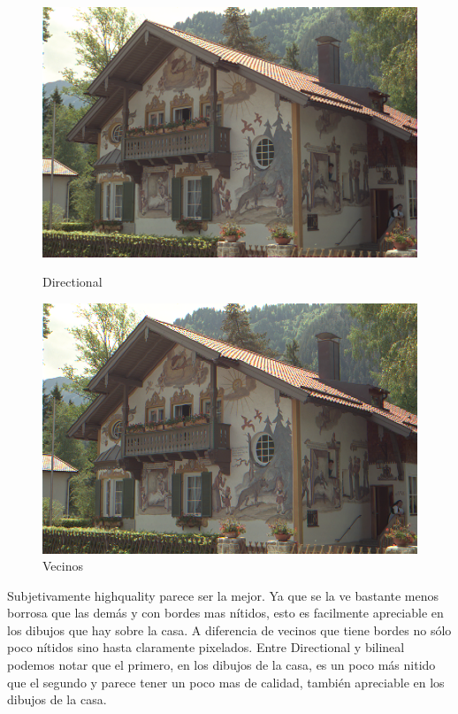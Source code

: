 {\begin{figure}
\begin{center}
    \includegraphics[scale=0.3]{imagenes/img12_demosicing_spline.png}
    \caption{Directional}
        \end{center}
\endminipage
{}
\begin{center}
    \includegraphics[scale=0.3]{imagenes/img12_demosicing_vecino.png}
    \caption{Vecinos}
 \end{center}
\endminipage
 
\end{figure}
\newpage

Subjetivamente highquality parece ser la mejor. Ya que se la ve bastante menos borrosa que las demás y con bordes mas nítidos, esto es facilmente apreciable en los dibujos que hay sobre la casa. A diferencia de vecinos que tiene bordes no sólo poco nítidos sino hasta claramente pixelados. Entre Directional y bilineal podemos notar que el primero, en los dibujos de la casa, es un poco más nitido que el segundo y parece tener un poco mas de calidad, también apreciable en los dibujos de la casa.

}
